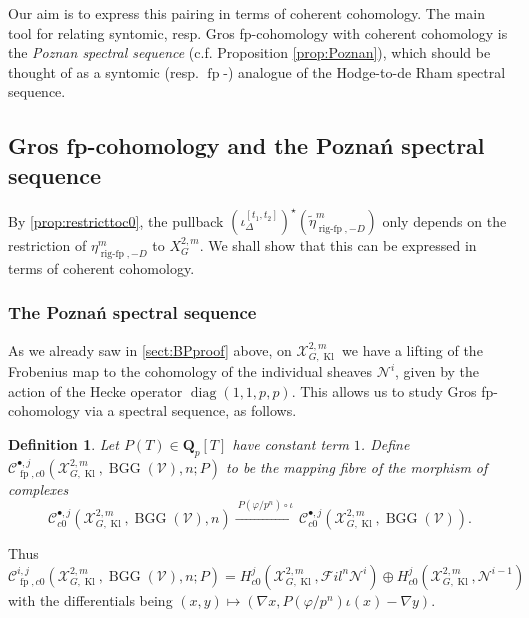 \documentclass[cjm]{ipart}
\theoremstyle{plain}
\newtheorem{definition}[theorem]{Definition}
\theoremstyle{remark}
\DeclareMathOperator{\BGG}{BGG}
\DeclareMathOperator{\diag}{diag}
\DeclareMathOperator{\fp}{fp}
\DeclareMathOperator{\Kl}{Kl}
\DeclareMathOperator{\rigfp}{rig-fp}
\newcommand{\QQ}{\mathbf{Q}}
\newcommand{\Qp}{\QQ_p}
\newcommand{\cN}{\mathcal{N}}
\newcommand{\cV}{\mathcal{V}}
\newcommand{\cX}{\mathcal{X}}
\newcommand{\sC}{\mathscr{C}}
\newcommand{\sFil}{{\mathscr Fil}}
\numberwithin{equation}{subsection}
\begin{document}
Our aim is to express this pairing in terms of coherent cohomology. The main tool for relating syntomic, resp. Gros fp-cohomology with coherent cohomology is the \emph{ Poznan spectral sequence} (c.f. Proposition \ref{prop:Poznan}), which should be thought of as a syntomic (resp. $\fp$-) analogue of the Hodge-to-de Rham spectral sequence.




 \subsection{Gros fp-cohomology and the Pozna\'n spectral sequence}\label{section:Poznan}

  By \cref{prop:restricttoc0}, the pullback $(\iota_\Delta^{[t_1,t_2]})^\star( \tilde\eta_{\rigfp,-D}^{m})$ only depends on the restriction of $ \eta_{\rigfp,-D}^{m}$ to $X_G^{2,m}$. We shall show that this can be expressed in terms of coherent cohomology.



  \subsubsection*{The Pozna\'n spectral sequence}

   As we already saw in \cref{sect:BPproof} above, on $\cX^{2,m}_{G,\Kl}$ we have  a lifting of the Frobenius map to the cohomology of the individual sheaves $\cN^i$, given by the action of the Hecke operator $\diag(1, 1, p, p)$. This allows us to study Gros fp-cohomology via a spectral sequence, as follows.

   \begin{definition}
    \label{def:cij}
    Let $P(T)\in\Qp[T]$ have constant term $1$. Define $\sC^{\bullet, j}_{\fp,c0}(\cX_{G,\Kl}^{2,m}, \BGG(\cV), n; P)$ to be the mapping fibre of the morphism of complexes
    \[
     \sC^{\bullet, j}_{c0}(\cX_{G,\Kl}^{2,m},\BGG(\cV), n) 
     \xrightarrow{\ P(\varphi / p^n) \circ \iota\ } 
     \sC^{\bullet, j}_{c0}(\cX_{G,\Kl}^{2,m},\BGG(\cV)).
    \]
   \end{definition}

   Thus
   \[ 
    \sC^{i, j}_{\fp,c0}(\cX_{G,\Kl}^{2,m}, \BGG(\cV), n; P) = 
    H^j_{c0}\left(\cX_{G,\Kl}^{2,m}, \sFil^n \cN^i \right) \oplus H^j_{c0}\left(\cX_{G,\Kl}^{2,m},\cN^{i-1}\right) 
   \]
   with the differentials being $(x, y) \mapsto (\nabla x, P(\varphi / p^n) \iota(x) - \nabla y)$.
\end{document}
